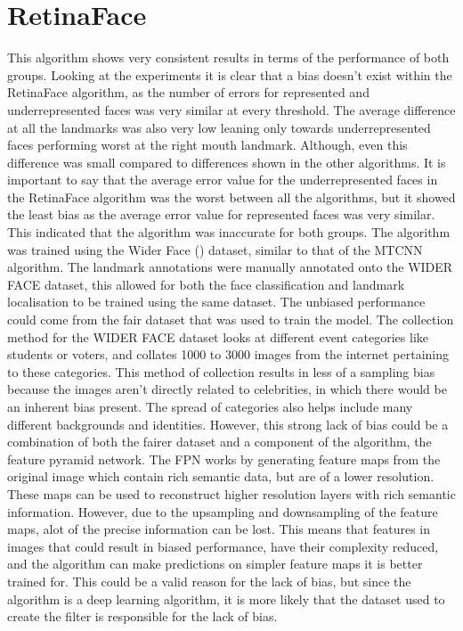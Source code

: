 \documentclass{l4proj}
\begin{document}
\section{RetinaFace}
This algorithm shows very consistent results in terms of the performance of both groups. Looking at the experiments it is clear that a bias doesn't exist within the RetinaFace algorithm, as the number of errors for represented and underrepresented faces was very similar at every threshold. The average difference at all the landmarks was also very low leaning only towards underrepresented faces performing worst at the right mouth landmark. Although, even this difference was small compared to differences shown in the other algorithms. It is important to say that the average error value for the underrepresented faces in the RetinaFace algorithm was the worst between all the algorithms, but it showed the least bias as the average error value for represented faces was very similar. This indicated that the algorithm was inaccurate for both groups. The algorithm was trained using the Wider Face (\cite{widerface}) dataset, similar to that of the MTCNN algorithm. The landmark annotations were manually annotated onto the WIDER FACE dataset, this allowed for both the face classification and landmark localisation to be trained using the same dataset. The unbiased performance could come from the fair dataset that was used to train the model. The collection method for the WIDER FACE dataset looks at different event categories like students or voters, and collates 1000 to 3000 images from the internet pertaining to these categories. This method of collection results in less of a sampling bias because the images aren't directly related to celebrities, in which there would be an inherent bias present. The spread of categories also helps include many different backgrounds and identities. However, this strong lack of bias could be a combination of both the fairer dataset and a component of the algorithm, the feature pyramid network. The FPN works by generating feature maps from the original image which contain rich semantic data, but are of a lower resolution. These maps can be used to reconstruct higher resolution layers with rich semantic information. However, due to the upsampling and downsampling of the feature maps, alot of the precise information can be lost. This means that features in images that could result in biased performance, have their complexity reduced, and the algorithm can make predictions on simpler feature maps it is better trained for. This could be a valid reason for the lack of bias, but since the algorithm is a deep learning algorithm, it is more likely that the dataset used to create the filter is responsible for the lack of bias.
\end{document}

